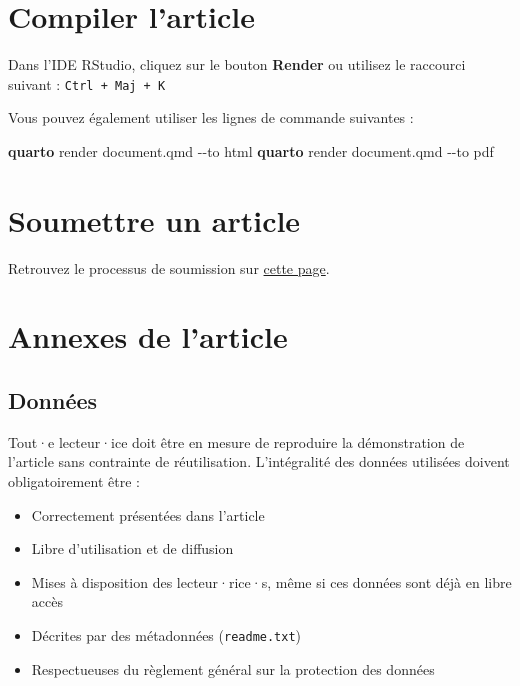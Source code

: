 \documentclass[
  french,
  11pt,
  a4paper,
]{article}
\newenvironment{Shaded}{}{}
\newcommand{\AttributeTok}[1]{\textcolor[rgb]{0.84,0.23,0.29}{#1}}
\newcommand{\ExtensionTok}[1]{\textcolor[rgb]{0.84,0.23,0.29}{\textbf{#1}}}
\newcommand{\NormalTok}[1]{\textcolor[rgb]{0.14,0.16,0.18}{#1}}
\providecommand{\tightlist}{%
  \setlength{\itemsep}{0pt}\setlength{\parskip}{0pt}}
\begin{document}
\section{Compiler l'article}\label{compiler-larticle}

Dans l'IDE RStudio, cliquez sur le bouton \textbf{Render} ou utilisez le
raccourci suivant : \texttt{Ctrl\ +\ Maj\ +\ K}

Vous pouvez également utiliser les lignes de commande suivantes :

\begin{Shaded}
\begin{Highlighting}[]
\ExtensionTok{quarto}\NormalTok{ render document.qmd }\AttributeTok{{-}{-}to}\NormalTok{ html}
\ExtensionTok{quarto}\NormalTok{ render document.qmd }\AttributeTok{{-}{-}to}\NormalTok{ pdf}
\end{Highlighting}
\end{Shaded}

\section{Soumettre un article}\label{soumettre-un-article}

Retrouvez le processus de soumission sur
\href{https://rzine.fr/documentation/soumission/}{cette page}.

\section{Annexes de l'article}\label{annexes-de-larticle}

\subsection{Données}\label{donnuxe9es}

Tout·e lecteur·ice doit être en mesure de reproduire la démonstration de
l'article sans contrainte de réutilisation. L'intégralité des données
utilisées doivent obligatoirement être :

\begin{itemize}
\tightlist
\item
  Correctement présentées dans l'article
\item
  Libre d'utilisation et de diffusion
\item
  Mises à disposition des lecteur·rice·s, même si ces données sont déjà
  en libre accès
\item
  Décrites par des métadonnées (\texttt{readme.txt})
\item
  Respectueuses du règlement général sur la protection des données
\end{itemize}
\end{document}
